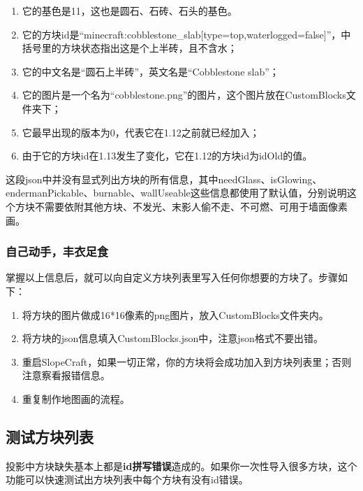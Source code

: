 \documentclass[UTF8]{ctexart}
\begin{document}
    \begin{enumerate}
        \item 它的基色是11，这也是圆石、石砖、石头的基色。
    
        \item 它的方块id是“minecraft:cobblestone\_slab[type=top,waterlogged=false]”，中括号里的方块状态指出这是个上半砖，且不含水；
    
        \item 它的中文名是“圆石上半砖”，英文名是“Cobblestone slab”；
    
        \item 它的图片是一个名为“cobblestone.png”的图片，这个图片放在CustomBlocks文件夹下；
    
        \item 它最早出现的版本为0，代表它在1.12之前就已经加入；
    
        \item 由于它的方块id在1.13发生了变化，它在1.12的方块id为idOld的值。

\end{enumerate}

    这段json中并没有显式列出方块的所有信息，其中needGlass、isGlowing、endermanPickable、burnable、wallUseable这些信息都使用了默认值，分别说明这个方块不需要依附其他方块、不发光、末影人偷不走、不可燃、可用于墙面像素画。

    \subsubsection{自己动手，丰衣足食}
    掌握以上信息后，就可以向自定义方块列表里写入任何你想要的方块了。步骤如下：

    \begin{enumerate}
        \item 将方块的图片做成16*16像素的png图片，放入CustomBlocks文件夹内。
        \item 将方块的json信息填入CustomBlocks.json中，注意json格式不要出错。
        \item 重启SlopeCraft，如果一切正常，你的方块将会成功加入到方块列表里；否则注意察看报错信息。
        \item 重复制作地图画的流程。
    \end{enumerate}

    \subsection{测试方块列表}
    投影中方块缺失基本上都是\textbf{id拼写错误}造成的。如果你一次性导入很多方块，这个功能可以快速测试出方块列表中每个方块有没有id错误。
\end{document}
